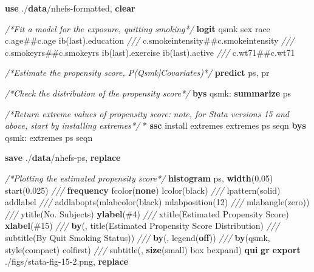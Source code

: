 \documentclass[
  10pt,
]{book}
\newenvironment{Shaded}{\begin{snugshade}}{\end{snugshade}}
\newcommand{\BaseNTok}[1]{\textcolor[rgb]{0.00,0.00,0.81}{#1}}
\newcommand{\CommentTok}[1]{\textcolor[rgb]{0.56,0.35,0.01}{\textit{#1}}}
\newcommand{\FunctionTok}[1]{\textcolor[rgb]{0.00,0.00,0.00}{#1}}
\newcommand{\KeywordTok}[1]{\textcolor[rgb]{0.13,0.29,0.53}{\textbf{#1}}}
\newcommand{\NormalTok}[1]{#1}
\begin{document}
\begin{Shaded}
\begin{Highlighting}[]
\KeywordTok{use}\NormalTok{ ./}\KeywordTok{data}\NormalTok{/nhefs{-}formatted, }\KeywordTok{clear}

\CommentTok{/*Fit a model for the exposure, quitting smoking*/}
\KeywordTok{logit}\NormalTok{ qsmk sex race c.age\#\#c.age ib(}\FunctionTok{last}\NormalTok{).education }\CommentTok{///}
\NormalTok{  c.smokeintensity\#\#c.smokeintensity }\CommentTok{///}
\NormalTok{  c.smokeyrs\#\#c.smokeyrs ib(}\FunctionTok{last}\NormalTok{).exercise ib(}\FunctionTok{last}\NormalTok{).active }\CommentTok{///}
\NormalTok{  c.wt71\#\#c.wt71 }

\CommentTok{/*Estimate the propensity score, P(Qsmk|Covariates)*/}
\KeywordTok{predict}\NormalTok{ ps, pr}

\CommentTok{/*Check the distribution of the propensity score*/}
\KeywordTok{bys}\NormalTok{ qsmk: }\KeywordTok{summarize}\NormalTok{ ps }

\CommentTok{/*Return extreme values of propensity score:}
\CommentTok{  note, for Stata versions 15 and above, start by installing extremes*/}
\NormalTok{* }\KeywordTok{ssc}\NormalTok{ install extremes}
\NormalTok{extremes ps seqn}
\KeywordTok{bys}\NormalTok{ qsmk: extremes ps seqn}

\KeywordTok{save}\NormalTok{ ./}\KeywordTok{data}\NormalTok{/nhefs{-}ps, }\KeywordTok{replace}

\CommentTok{/*Plotting the estimated propensity score*/}
\KeywordTok{histogram}\NormalTok{ ps, }\KeywordTok{width}\NormalTok{(0.05) }\BaseNTok{start}\NormalTok{(0.025) }\CommentTok{///}
  \KeywordTok{frequency}\NormalTok{ fcolor(}\KeywordTok{none}\NormalTok{) lcolor(}\BaseNTok{black}\NormalTok{) }\CommentTok{///}
\NormalTok{  lpattern(solid) addlabel }\CommentTok{///}
  \BaseNTok{addlabopts}\NormalTok{(}\BaseNTok{mlabcolor}\NormalTok{(}\BaseNTok{black}\NormalTok{) }\BaseNTok{mlabposition}\NormalTok{(12) }\CommentTok{///}
  \BaseNTok{mlabangle}\NormalTok{(}\BaseNTok{zero}\NormalTok{)) }\CommentTok{///}
  \BaseNTok{ytitle}\NormalTok{(No. Subjects) }\KeywordTok{ylabel}\NormalTok{(\#4) }\CommentTok{///}
  \BaseNTok{xtitle}\NormalTok{(Estimated Propensity Score) }\KeywordTok{xlabel}\NormalTok{(\#15) }\CommentTok{///}
  \KeywordTok{by}\NormalTok{(, }\BaseNTok{title}\NormalTok{(Estimated Propensity Score Distribution) }\CommentTok{///}
  \BaseNTok{subtitle}\NormalTok{(By Quit Smoking Status)) }\CommentTok{///}
  \KeywordTok{by}\NormalTok{(, }\BaseNTok{legend}\NormalTok{(}\KeywordTok{off}\NormalTok{)) }\CommentTok{///}
  \KeywordTok{by}\NormalTok{(qsmk, style(compact) colfirst) }\CommentTok{///}
  \BaseNTok{subtitle}\NormalTok{(, }\KeywordTok{size}\NormalTok{(small) box bexpand)}
\KeywordTok{qui} \KeywordTok{gr} \KeywordTok{export}\NormalTok{ ./figs/stata{-}fig{-}15{-}2.png, }\KeywordTok{replace}
\end{Highlighting}
\end{Shaded}
\end{document}
